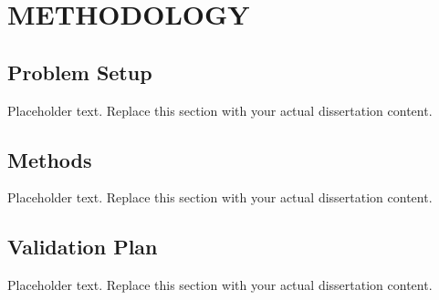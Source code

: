 
\chapter{METHODOLOGY}

\section{Problem Setup}
Placeholder text. Replace this section with your actual dissertation content.

\section{Methods}
Placeholder text. Replace this section with your actual dissertation content.

\section{Validation Plan}
Placeholder text. Replace this section with your actual dissertation content.
